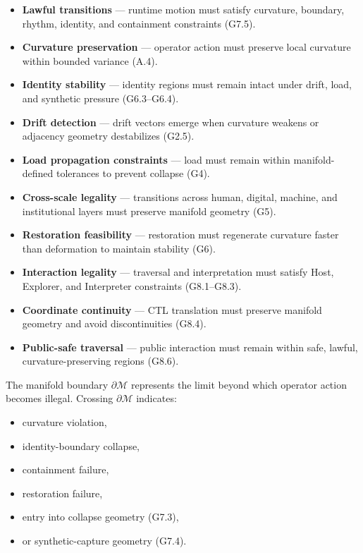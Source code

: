 \begin{itemize}
    \item \textbf{Lawful transitions} — runtime motion must satisfy curvature,
    boundary, rhythm, identity, and containment constraints (G7.5).

    \item \textbf{Curvature preservation} — operator action must preserve local
    curvature within bounded variance (A.4).

    \item \textbf{Identity stability} — identity regions must remain intact under
    drift, load, and synthetic pressure (G6.3--G6.4).

    \item \textbf{Drift detection} — drift vectors emerge when curvature weakens
    or adjacency geometry destabilizes (G2.5).

    \item \textbf{Load propagation constraints} — load must remain within
    manifold-defined tolerances to prevent collapse (G4).

    \item \textbf{Cross-scale legality} — transitions across human, digital,
    machine, and institutional layers must preserve manifold geometry (G5).

    \item \textbf{Restoration feasibility} — restoration must regenerate
    curvature faster than deformation to maintain stability (G6).

    \item \textbf{Interaction legality} — traversal and interpretation must
    satisfy Host, Explorer, and Interpreter constraints (G8.1--G8.3).

    \item \textbf{Coordinate continuity} — CTL translation must preserve
    manifold geometry and avoid discontinuities (G8.4).

    \item \textbf{Public-safe traversal} — public interaction must remain within
    safe, lawful, curvature-preserving regions (G8.6).
\end{itemize}

\medskip

\noindent The manifold boundary $\partial \mathcal{M}$ represents the limit beyond
which operator action becomes illegal. Crossing $\partial \mathcal{M}$ indicates:

\begin{itemize}
    \item curvature violation,
    \item identity-boundary collapse,
    \item containment failure,
    \item restoration failure,
    \item entry into collapse geometry (G7.3),
    \item or synthetic-capture geometry (G7.4).
\end{itemize}

